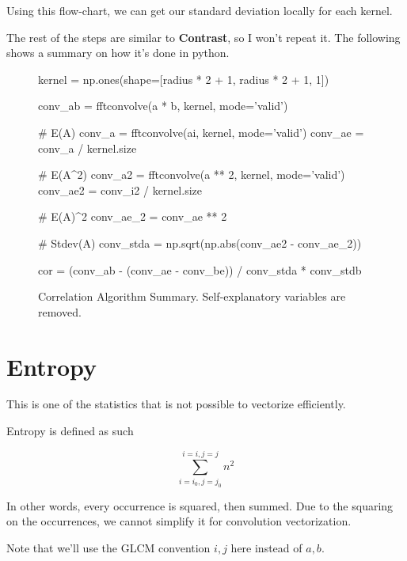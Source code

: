 \documentclass[article,oneside]{memoir}
\begin{document}
Using this flow-chart, we can get our standard deviation locally for each kernel.

The rest of the steps are similar to \textbf{Contrast}, so I won't repeat it. The following shows a summary on how it's done in python.

\begin{figure}[H]
\begin{python}
kernel = np.ones(shape=[radius * 2 + 1, radius * 2 + 1, 1])

conv_ab = fftconvolve(a * b, kernel, mode='valid')

# E(A) 
conv_a = fftconvolve(ai, kernel, mode='valid')
conv_ae = conv_a / kernel.size

# E(A^2)
conv_a2 = fftconvolve(a ** 2, kernel, mode='valid')
conv_ae2 = conv_i2 / kernel.size

# E(A)^2
conv_ae_2 = conv_ae ** 2

# Stdev(A)
conv_stda = np.sqrt(np.abs(conv_ae2 - conv_ae_2))

cor = (conv_ab - (conv_ae - conv_be)) / conv_stda * conv_stdb
\end{python}

\caption{Correlation Algorithm Summary. Self-explanatory variables are removed.}
\label{Correlation Algorithm Summary}
\end{figure}

\newpage
\section{Entropy}

This is one of the statistics that is not possible to vectorize efficiently.

Entropy is defined as such

$$\sum_{i=i_0,j=j_0}^{i=i,j=j} n^2$$

In other words, every occurrence is squared, then summed. Due to the squaring on the occurrences, we cannot simplify it for convolution vectorization.

Note that we'll use the GLCM convention $i, j$ here instead of $a, b$.
\end{document}
